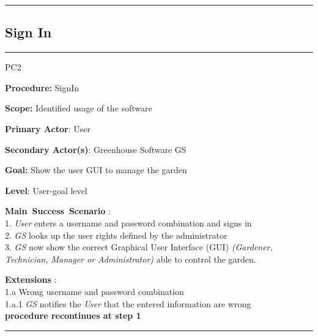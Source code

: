 \hrule
\vspace{0.5cm}


\subsection{Sign In}
\vspace{0.5cm}
\hrule
\hfill \break
\begin{lyxlist}{PC2}
\small{
\item [\textbf{Procedure:}] SignIn
\item [\textbf{Scope:}] Identified usage of the software
\item [\textbf{Primary Actor}:] User
\item [\textbf{Secondary Actor(s)}:] Greenhouse Software GS
\item [\textbf{Goal:}] Show the user GUI to manage the garden
\item [\textbf{Level}:] User-goal level
\item [\textbf{Main~Success~Scenario}]:\\
1. \emph{User} enters a username and password combination and signs in\\
2. \emph{GS} looks up the user rights defined by the administrator\\
3. \emph{GS} now show the correct Graphical User Interface (GUI) \emph{(Gardener, Technician, Manager or Administrator)} able to control the garden.
\item [\textbf{Extensions}]:\\
1.a Wrong username and password combination\\
\hspace*{0.5cm} 1.a.1 \emph{GS} notifies the \emph{User} that the entered information are wrong\\
\hspace*{0.5cm} \textbf{procedure recontinues at step 1}
}
\end{lyxlist}
\hrule
\vspace{0.5cm}



